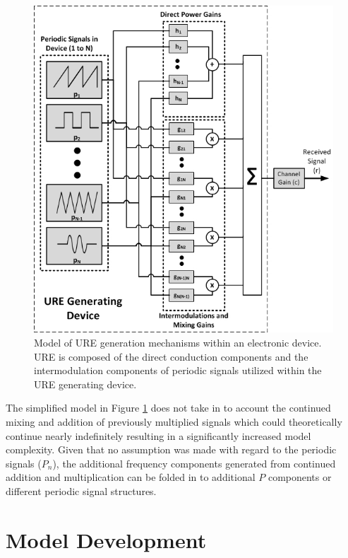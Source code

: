 \begin{figure}[tb]
	\includegraphics[width=\textwidth]{./model_results/URE_Model.jpg}
	\centering
	\caption{Model of URE generation mechanisms within an electronic device.  URE is composed of the direct conduction components and the intermodulation components of periodic signals utilized within the URE generating device.}
	\label{fig:ure_model}
\end{figure}

The simplified model in Figure \ref{fig:ure_model} does not take in to account the continued mixing and addition of previously multiplied signals which could theoretically continue nearly indefinitely resulting in a significantly increased model complexity.  Given that no assumption was made with regard to the periodic signals ($P_n$), the additional frequency components generated from continued addition and multiplication can be folded in to additional $P$ components or different periodic signal structures. 

\section[Model Development]{Model Development}

